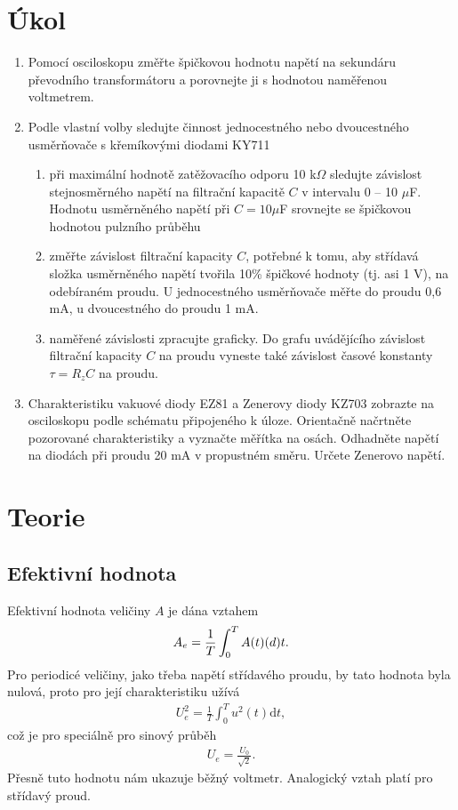 \documentclass[a4paper,12pt]{article}
\begin{document}
\section{Úkol}
\noindent
\begin{enumerate}
    \item Pomocí osciloskopu změřte špičkovou hodnotu napětí na sekundáru převodního transformátoru a porovnejte ji s hodnotou naměřenou voltmetrem.
    \item Podle vlastní volby sledujte činnost jednocestného nebo dvoucestného usměrňovače s křemíkovými diodami KY711
    \begin{enumerate}
        \item při maximální hodnotě zatěžovacího odporu 10 k$\Omega$ sledujte závislost stejnosměrného napětí na filtrační kapacitě $C$ v intervalu 0 – 10 $\mu$F. Hodnotu usměrněného napětí při $C = 10 \mu$F srovnejte se špičkovou hodnotou pulzního průběhu
        \item změřte závislost filtrační kapacity $C$, potřebné k tomu, aby střídavá složka usměrněného napětí tvořila 10\% špičkové hodnoty (tj. asi 1 V), na odebíraném proudu. U jednocestného usměrňovače měřte do proudu 0,6 mA, u dvoucestného do proudu 1 mA.
        \item naměřené závislosti zpracujte graficky. Do grafu uvádějícího závislost filtrační kapacity $C$ na proudu vyneste také závislost časové konstanty $\tau = R_zC$ na proudu. 
    \end{enumerate}
    \item Charakteristiku vakuové diody EZ81 a Zenerovy diody KZ703 zobrazte na osciloskopu podle schématu připojeného k úloze. Orientačně načrtněte pozorované charakteristiky a vyznačte měřítka na osách. Odhadněte napětí na diodách při proudu 20 mA v propustném směru. Určete Zenerovo napětí. 
\end{enumerate}

\section{Teorie}
\subsection{Efektivní hodnota}
Efektivní hodnota veličiny $A$ je dána vztahem
\begin{eqnarray}
A_e=\frac{1}{T}\int_0^TA(t)\mbox(d)t.
\end{eqnarray}
Pro periodicé veličiny, jako třeba napětí střídavého proudu, by tato hodnota byla nulová, proto pro její charakteristiku užívá
\begin{eqnarray}
U_e^2=\frac{1}{T}\int_0^Tu^2(t)\mbox{d}t,
\end{eqnarray}
což je pro speciálně pro sinový průběh
\begin{eqnarray}
U_e=\frac{U_0}{\sqrt{2}}.
\label{U_e}
\end{eqnarray}
Přesně tuto hodnotu nám ukazuje běžný voltmetr. Analogický vztah platí pro střídavý proud.
\end{document}
